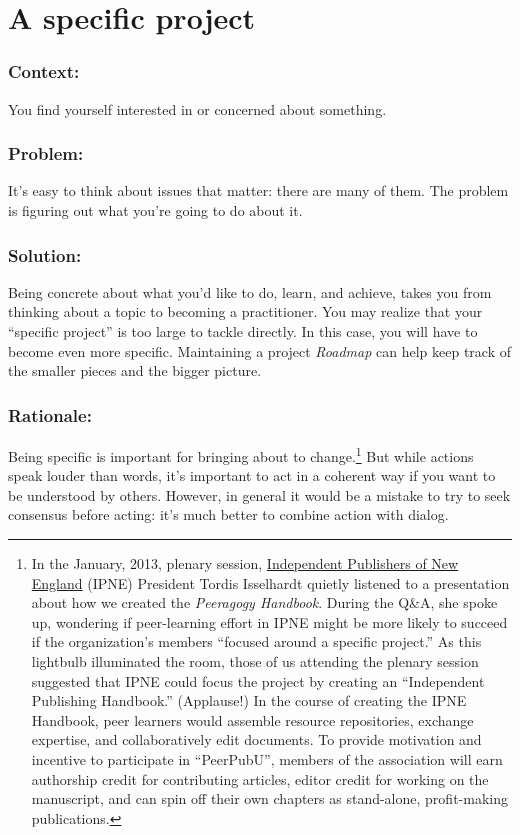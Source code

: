 \section{A specific project}
\subsubsection*{Context:}
You find yourself interested in or concerned about something.

\subsubsection*{Problem:}
It's easy to think about issues that matter: there are many of them. The problem is figuring out what you're going to do about it.

\subsubsection*{Solution:} 
Being concrete about what you'd like to do, learn, and achieve, takes you from thinking about a topic to becoming a practitioner.  You may realize that your ``specific project'' is too large to tackle directly. In this case, you will have to become even more specific.  Maintaining a project \emph{Roadmap} can help keep track of the smaller pieces and the bigger picture.

\subsubsection*{Rationale:} 
Being specific is important for bringing about to change.\footnote{In the January, 2013, plenary
session, \href{http://ipne.org}{Independent Publishers of New England}
(IPNE) President Tordis Isselhardt quietly listened to a presentation
about how we created the \emph{Peeragogy Handbook}. During the Q\&A, she
spoke up, wondering if peer-learning effort in IPNE might be more likely
to succeed if the organization's members ``focused around a specific
project.'' As this lightbulb illuminated the room, those of us attending
the plenary session suggested that IPNE could focus the project by
creating an ``Independent Publishing Handbook.'' (Applause!) In the
course of creating the IPNE Handbook, peer learners would assemble
resource repositories, exchange expertise, and collaboratively edit
documents. To provide motivation and incentive to participate in
``PeerPubU'', members of the association will earn authorship credit for
contributing articles, editor credit for working on the manuscript, and
can spin off their own chapters as stand-alone, profit-making
publications.} But while actions speak louder than words, it's important
to act in a coherent way if you want to be understood by others.  However, in
general it would be a mistake to try to seek consensus before acting: it's much better to combine action with dialog.


